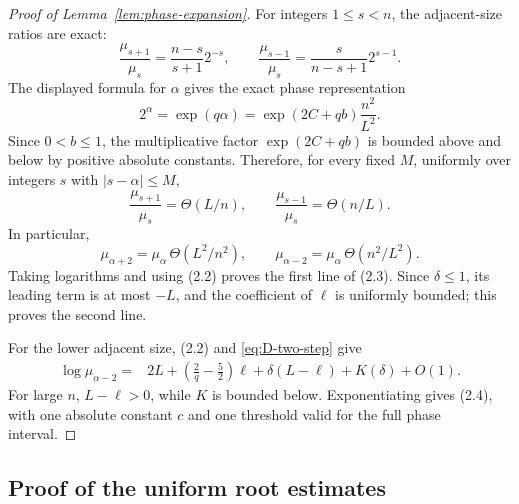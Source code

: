 \documentclass[a4paper,10pt,reqno]{amsart}
\numberwithin{equation}{section}
\theoremstyle{plain}
\theoremstyle{remark}
\begin{document}
\begin{proof}[Proof of Lemma~\ref{lem:phase-expansion}]
For integers $1\le s<n$, the adjacent-size ratios are exact:
\begin{equation}
  \frac{\mu_{s+1}}{\mu_s}
  =\frac{n-s}{s+1}2^{-s},
  \qquad
  \frac{\mu_{s-1}}{\mu_s}
  =\frac{s}{n-s+1}2^{s-1}.
  \label{eq:D-adjacent}
\end{equation}
The displayed formula for $\alpha$ gives the exact phase representation
\[
  2^\alpha
  =\exp(q\alpha)
  =\exp(2C+qb)\frac{n^2}{L^2}.
\]
Since $0<b\le1$, the multiplicative factor $\exp(2C+qb)$ is bounded
above and below by positive absolute constants. Therefore, for every fixed
$M$, uniformly over integers $s$ with $|s-\alpha|\le M$,
\[
  \frac{\mu_{s+1}}{\mu_s}=\Theta(L/n),
  \qquad
  \frac{\mu_{s-1}}{\mu_s}=\Theta(n/L).
\]
In particular,
\begin{equation}
  \mu_{\alpha+2}
  =\mu_\alpha\,\Theta(L^2/n^2),
  \qquad
  \mu_{\alpha-2}
  =\mu_\alpha\,\Theta(n^2/L^2).
  \label{eq:D-two-step}
\end{equation}
Taking logarithms and using (2.2) proves the first line of (2.3). Since
$\delta\le1$, its leading term is at most $-L$, and the coefficient of
$\ell$ is uniformly bounded; this proves the second line.

For the lower adjacent size, (2.2) and \eqref{eq:D-two-step} give
\[
\begin{split}
  \log\mu_{\alpha-2}
  ={}&2L+\left(\frac2q-\frac52\right)\ell
      +\delta(L-\ell)+K(\delta)+O(1).
\end{split}
\]
For large $n$, $L-\ell>0$, while $K$ is bounded below. Exponentiating gives
(2.4), with one absolute constant $c$ and one threshold valid for
the full phase interval.
\end{proof}

\subsection{Proof of the uniform root estimates}
\label{app:uniform-root-proof}
\end{document}
